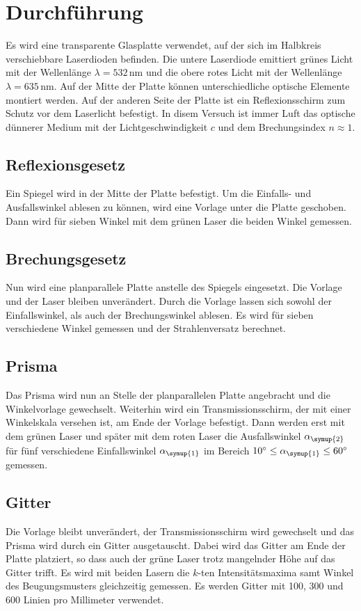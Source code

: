 \section{Durchführung}
\label{sec:Durchführung}
Es wird eine transparente Glasplatte verwendet, auf der sich im Halbkreis verschiebbare Laserdioden befinden.
Die untere Laserdiode emittiert grünes Licht mit der Wellenlänge $\lambda=532\,\unit{\nano\meter}$ und die
obere rotes Licht mit der Wellenlänge $\lambda=635\,\unit{\nano\meter}$. Auf der Mitte der Platte können
unterschiedliche optische Elemente montiert werden. Auf der anderen Seite der Platte ist ein Reflexionsschirm
zum Schutz vor dem Laserlicht befestigt. In disem Versuch ist immer Luft das optische dünnerer Medium mit der
Lichtgeschwindigkeit $c$ und dem Brechungsindex $n\approx1$.

\subsection{Reflexionsgesetz}
\label{sec:Reflexionsgesetz}
Ein Spiegel wird in der Mitte der Platte befestigt. Um die Einfalls- und Ausfallswinkel ablesen zu können,
wird eine Vorlage unter die Platte geschoben. Dann wird für sieben Winkel mit dem grünen Laser die
beiden Winkel gemessen.

\subsection{Brechungsgesetz}
\label{sec:Brechungsgesetz}
Nun wird eine planparallele Platte anstelle des Spiegels eingesetzt. Die Vorlage und der Laser bleiben
unverändert. Durch die Vorlage lassen sich sowohl der Einfallswinkel, als auch der Brechungswinkel
ablesen. Es wird für sieben verschiedene Winkel gemessen und der Strahlenversatz berechnet.

\subsection{Prisma}
\label{sec:Prisma}
Das Prisma wird nun an Stelle der planparallelen Platte angebracht und die Winkelvorlage gewechselt.
Weiterhin wird ein Transmissionsschirm, der mit einer Winkelskala versehen ist, am Ende der Vorlage befestigt.
Dann werden erst mit dem grünen Laser und später mit dem roten Laser die Ausfallswinkel $\alpha_{\symup{2}}$ für
fünf verschiedene Einfallswinkel $\alpha_{\symup{1}}$ im Bereich $10^{\circ} \leq \alpha_{\symup{1}} \leq 60^{\circ}$
gemessen.

\subsection{Gitter}
\label{sec:Gitter}
Die Vorlage bleibt unverändert, der Transmissionsschirm wird gewechselt und das Prisma wird durch ein Gitter ausgetauscht.
Dabei wird das Gitter am Ende der Platte platziert, so dass auch der grüne Laser trotz mangelnder Höhe auf das Gitter trifft.
Es wird mit beiden Lasern die $k$-ten Intensitätsmaxima samt Winkel des Beugungsmusters gleichzeitig gemessen.
Es werden Gitter mit 100, 300 und 600 Linien pro Millimeter verwendet.